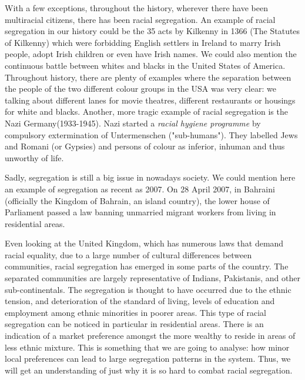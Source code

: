 \documentclass[../main.tex]{subfiles}
\begin{document}
With a few exceptions, throughout the history, wherever there have been multiracial citizens, there has been racial segregation. An example of racial segregation in our history could be the 35 acts by Kilkenny in 1366 (The Statutes of Kilkenny) which were forbidding English settlers in Ireland to marry Irish people, adopt Irish children or even have Irish names. We could also mention the continuous battle between whites and blacks in the United States of America. Throughout history, there are plenty of examples where the separation between the people of the two different colour groups in the USA was very clear: we talking about different lanes for movie theatres, different restaurants or housings for white and blacks. Another, more tragic example of racial segregation is the Nazi Germany(1933-1945). Nazi started a \textit{racial hygiene programme} by compulsory extermination of Untermenschen ("sub-humans"). They labelled Jews and Romani (or Gypsies) and persons of colour as inferior, inhuman and thus unworthy of life. \cite[]{nazi}

Sadly, segregation is still a big issue in nowadays society. We could mention here an example of segregation as recent as 2007. On 28 April 2007, in Bahraini (officially the Kingdom of Bahrain, an island country), the lower house of Parliament passed a law banning unmarried migrant workers from living in residential areas. \cite[]{bahraini}

Even looking at the United Kingdom, which has numerous laws that demand racial equality, due to a large number of cultural differences between communities, racial segregation has emerged in some parts of the country. The separated communities are largely representative of Indians, Pakistanis, and other sub-continentals. The segregation is thought to have occurred due to the ethnic tension, and deterioration of the standard of living, levels of education and employment among ethnic minorities in poorer areas. This type of racial segregation can be noticed in particular in residential areas. There is an indication of a market preference amongst the more wealthy to reside in areas of less ethnic mixture.\cite[]{segregation} This is something that we are going to analyse: how minor local preferences can lead to large segregation patterns in the system.  Thus, we will get an understanding of just why it is so hard to combat racial segregation.
\end{document}
